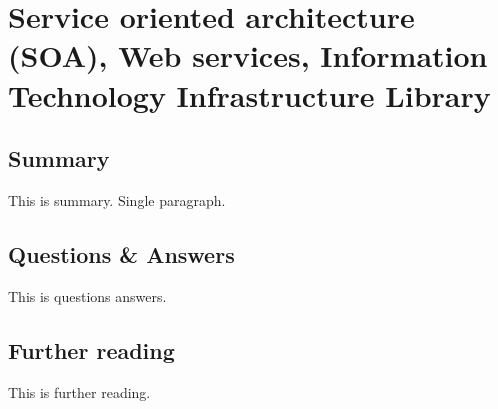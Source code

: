 \section{Service oriented architecture (SOA), Web services, Information Technology Infrastructure Library}

\subsection{Summary}
This is summary. Single paragraph.

\subsection{Questions \& Answers}
This is questions answers.

\subsection{Further reading}
This is further reading.
